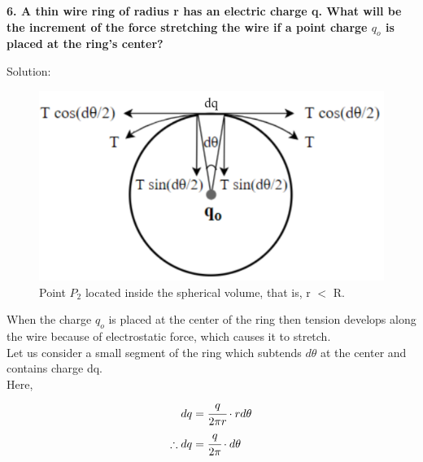\newpage
\begin{tcolorbox}
\textbf{6. A thin wire ring of radius r has an electric charge q. What will be the increment of the force stretching the wire if a point charge $q_o$ is placed at the ring's center?}
\end{tcolorbox}
Solution:
\begin{figure}
     \centering 
     \includegraphics[scale = 0.46]{figures/elecmag/tnsnrng.png}
     \caption{Point $P_2$ located inside the spherical volume, that is, r $<$ R. }
     \label{tnsrng}
 \end{figure}
When the charge $q_o$ is placed at the center of the ring then tension develops along the wire because of electrostatic force, which causes it to stretch.\\
Let us consider a small segment of the ring which subtends $d\theta$ at the center and contains charge dq.\\
Here,
\begin{align}
    dq &= \cfrac{q}{2 \pi r}\cdot r d\theta \nonumber\\
    \therefore dq &= \cfrac{q}{2 \pi} \cdot d\theta
\end{align} 

